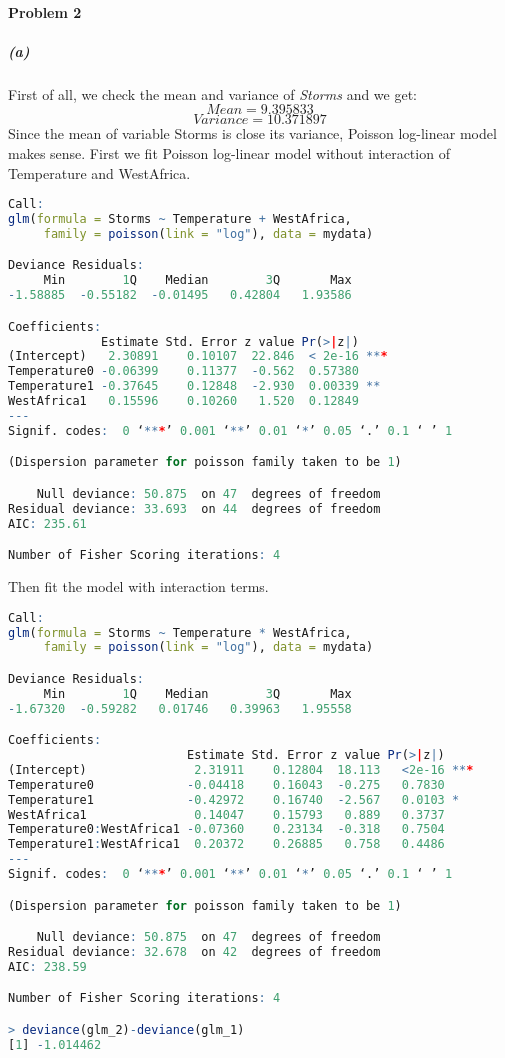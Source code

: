 \documentclass[12pt,a4paper]{article}
\begin{document}
\paragraph{Problem 2}
\subparagraph{(a)}
First of all, we check the mean and variance of \emph{Storms} and we get:
\[Mean = 9.395833 \]
\[Variance =  10.371897\]
Since the mean of variable Storms is close its variance, Poisson log-linear model makes sense. First we ﬁt Poisson log-linear model without interaction of Temperature and WestAfrica. 
\begin{lstlisting}[language = R]
Call:
glm(formula = Storms ~ Temperature + WestAfrica, 
     family = poisson(link = "log"), data = mydata)

Deviance Residuals: 
     Min        1Q    Median        3Q       Max  
-1.58885  -0.55182  -0.01495   0.42804   1.93586  

Coefficients:
             Estimate Std. Error z value Pr(>|z|)    
(Intercept)   2.30891    0.10107  22.846  < 2e-16 ***
Temperature0 -0.06399    0.11377  -0.562  0.57380    
Temperature1 -0.37645    0.12848  -2.930  0.00339 ** 
WestAfrica1   0.15596    0.10260   1.520  0.12849    
---
Signif. codes:  0 ‘***’ 0.001 ‘**’ 0.01 ‘*’ 0.05 ‘.’ 0.1 ‘ ’ 1

(Dispersion parameter for poisson family taken to be 1)

    Null deviance: 50.875  on 47  degrees of freedom
Residual deviance: 33.693  on 44  degrees of freedom
AIC: 235.61

Number of Fisher Scoring iterations: 4
\end{lstlisting}
Then ﬁt the model with interaction terms.
\begin{lstlisting}[language = R]
Call:
glm(formula = Storms ~ Temperature * WestAfrica, 
     family = poisson(link = "log"), data = mydata)

Deviance Residuals: 
     Min        1Q    Median        3Q       Max  
-1.67320  -0.59282   0.01746   0.39963   1.95558  

Coefficients:
                         Estimate Std. Error z value Pr(>|z|)    
(Intercept)               2.31911    0.12804  18.113   <2e-16 ***
Temperature0             -0.04418    0.16043  -0.275   0.7830    
Temperature1             -0.42972    0.16740  -2.567   0.0103 *  
WestAfrica1               0.14047    0.15793   0.889   0.3737    
Temperature0:WestAfrica1 -0.07360    0.23134  -0.318   0.7504    
Temperature1:WestAfrica1  0.20372    0.26885   0.758   0.4486    
---
Signif. codes:  0 ‘***’ 0.001 ‘**’ 0.01 ‘*’ 0.05 ‘.’ 0.1 ‘ ’ 1

(Dispersion parameter for poisson family taken to be 1)

    Null deviance: 50.875  on 47  degrees of freedom
Residual deviance: 32.678  on 42  degrees of freedom
AIC: 238.59

Number of Fisher Scoring iterations: 4

> deviance(glm_2)-deviance(glm_1)
[1] -1.014462
\end{lstlisting}
\end{document}
